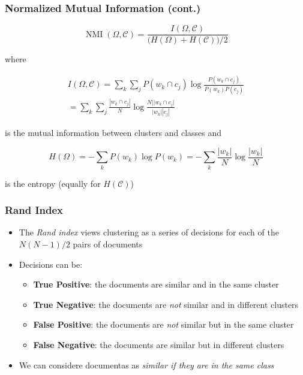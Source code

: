 \documentclass[svgnames]{beamer}
\begin{document}
\begin{frame}
    \frametitle{Normalized Mutual Information (cont.)}

    \begin{block}{}
        \begin{displaymath}
        \operatorname{NMI}(\Omega,\mathcal{C}) =
            \frac{I(\Omega,\mathcal{C})}{\big(H(\Omega)+H(\mathcal{C})\big)/2}
        \end{displaymath}
    \end{block}
    \footnotesize
    where
    \begin{block}{}
        \begin{multline*}
            I(\Omega,\mathcal{C}) = \sum_k\sum_jP(w_k \cap c_j)\log\frac{P(w_k \cap c_j)}{P(w_k)P(c_j)} \\
            = \sum_k\sum_j \frac{|w_k \cap c_j|}{N} \log\frac{N||w_k \cap c_j|}{|w_k||c_j|}
        \end{multline*}
    \end{block}
    is the mutual information between clusters and classes and
    \begin{block}{}
        \begin{displaymath}
            H(\Omega) = -\sum_k P(w_k)\log{P(w_k)} = -\sum_k\frac{|w_k|}{N}\log\frac{|w_k|}{N}
        \end{displaymath}
    \end{block}
    is the entropy (equally for $H(\mathcal{C})$)
\end{frame}

\begin{frame}
    \frametitle{Rand Index}
    \begin{itemize}
    \item The \emph{Rand index} views clustering as a series of decisions for
        each of the $N(N-1)/2$ pairs of documents
    \item Decisions can be:
        \begin{itemize}
        \item \textbf{True Positive}: the documents are similar and in the same cluster
        \item \textbf{True Negative}: the documents are \textit{not} similar and in different clusters
        \item \textbf{False Positive}: the documents are \textit{not} similar but in the same cluster
        \item \textbf{False Negative}: the documents are similar but in different clusters
        \end{itemize}
    \item We can considere documentas as \emph{similar if they are in the same class}
    \end{itemize}
\end{frame}
\end{document}
